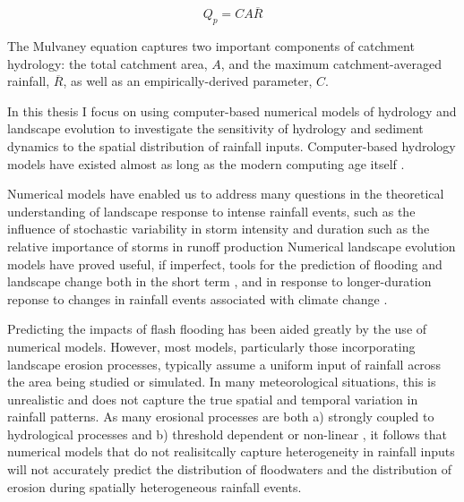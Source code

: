 \begin{equation}
Q_p = CA\overline{R}
\end{equation}

The Mulvaney equation captures two important components of catchment hydrology: the total catchment area, \(A\), and the maximum catchment-averaged rainfall, \(\overline{R}\), as well as an empirically-derived parameter, \(C\). 

In this thesis I focus on using computer-based numerical models of hydrology and landscape evolution to investigate the sensitivity of hydrology and sediment dynamics to the spatial distribution of rainfall inputs. Computer-based hydrology models have existed almost as long as the modern computing age itself \citep[e.g.][]{beven1979physically}.


Numerical models have enabled us to address many questions in the theoretical understanding of landscape response to intense rainfall events, such as the influence of stochastic variability in storm intensity and duration \citep{Tucker2000} such as the relative importance of storms in runoff production \citep{Darby2013}  Numerical landscape evolution models have proved useful, if imperfect, tools for the prediction of flooding and landscape change \citep{Tucker2010} both in the short term \citep{beven1984testing}, and in response to longer-duration reponse to changes in rainfall events associated with climate change \citep[e.g][]{coulthard2000modelling,Coulthard2012,hancock2017sediment}.

Predicting the impacts of flash flooding has been aided greatly by the use of numerical models. However, most models, particularly those incorporating landscape erosion processes, typically assume a uniform input of rainfall across the area being studied or simulated. In many meteorological situations, this is unrealistic and does not capture the true spatial and temporal variation in rainfall patterns. As many erosional processes are both a) strongly coupled to hydrological processes \citep{sidle2004hydrogeomorphology,loague2006physics,beven1989floods} and b) threshold dependent \citep{snyder2003importance} or non-linear \citep{coulthard1998non,phillips2003sources}, it follows that numerical models that do not realisitcally capture heterogeneity in rainfall inputs will not accurately predict the distribution of floodwaters and the distribution of erosion during spatially heterogeneous rainfall events.


